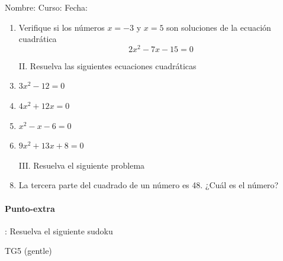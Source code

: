 \documentclass[fleqn]{article}
\newcommand{\LineaNombre}{%
\par
\vspace{\baselineskip}
Nombre:\hrulefill \; Curso: \underline{\hspace*{48pt}} \; Fecha: \underline{\hspace*{2.5cm}} \relax
\par}
\begin{document}
\LineaNombre
\begin{enumerate}
 \item Verifique si los números $x=-3$ \; y \; $x=5$ son soluciones de la ecuación cuadrática \[2x^{2}-7x-15=0\] \noanswer

\item[II.] Resuelva las siguientes ecuaciones cuadráticas
 \item $3x^{2}-12=0$\noanswer
 \item $4x^{2}+12x=0$\noanswer
 \newpage
 \item $x^{2}-x-6=0$\noanswer
 \item $9x^{2}+13x+8=0$\noanswer
 \item[III.] Resuelva el siguiente problema
 \item La tercera parte del cuadrado de un número es 48. ¿Cuál es el número?\noanswer
 \end{enumerate}
 \begin{minipage}{.4\textwidth}
\paragraph*{Punto-extra}: Resuelva el siguiente sudoku 
 \end{minipage}
 \cluefont{\Large}
\begin{minipage}{.55\textwidth}
\begin{minipage}{0.45\linewidth}\begin{center}
TG5 (gentle) \\
\end{center}\end{minipage}
\end{minipage}
\end{document}
